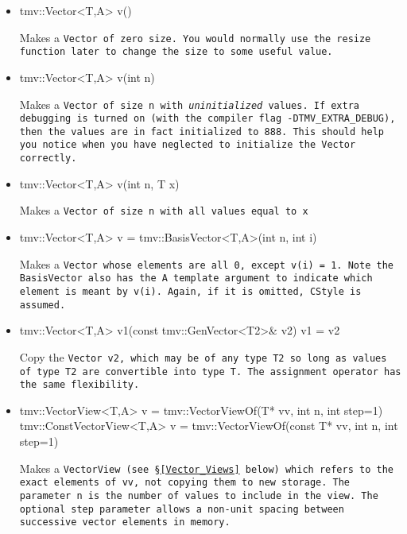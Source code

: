 \begin{itemize}

\item 
\begin{tmvcode}
tmv::Vector<T,A> v()
\end{tmvcode}
Makes a \tt{Vector} of zero size.  You would normally use the \tt{resize} function later to 
change the size to some useful value.

\item 
\begin{tmvcode}
tmv::Vector<T,A> v(int n)
\end{tmvcode}
Makes a \tt{Vector} of size \tt{n} with {\em uninitialized} values.
If extra debugging is turned on (with the compiler flag \tt{-DTMV\_EXTRA\_DEBUG}), then the values are in fact initialized to 888.  This should help you notice when you have neglected to initialize the \tt{Vector} correctly.

\item
\begin{tmvcode}
tmv::Vector<T,A> v(int n, T x)
\end{tmvcode}
Makes a \tt{Vector} of size \tt{n} with all values equal to \tt{x}

\item
\begin{tmvcode}
tmv::Vector<T,A> v = tmv::BasisVector<T,A>(int n, int i)
\end{tmvcode}
Makes a \tt{Vector} whose elements are all \tt{0}, except \tt{v(i) = 1}.
Note the \tt{BasisVector} also has the \tt{A} template argument to 
indicate which element is meant by \tt{v(i)}.  Again, if it is omitted,
\tt{CStyle} is assumed.

\item
\begin{tmvcode}
tmv::Vector<T,A> v1(const tmv::GenVector<T2>& v2)
v1 = v2
\end{tmvcode}
Copy the \tt{Vector v2}, which may be of any type \tt{T2} so long
as values of type \tt{T2} are convertible into type \tt{T}.
The assignment operator has the same flexibility.

\item
\begin{tmvcode}
tmv::VectorView<T,A> v = 
      tmv::VectorViewOf(T* vv, int n, int step=1)
tmv::ConstVectorView<T,A> v = 
      tmv::VectorViewOf(const T* vv, int n, int step=1)
\end{tmvcode}
Makes a \tt{VectorView} (see \S\ref{Vector_Views} below) which refers to the exact
elements of \tt{vv}, not copying them to new storage.  The parameter \tt{n}
is the number of values to include in the view.
The optional \tt{step} parameter allows a non-unit spacing between 
successive vector elements in memory. 

\end{itemize}

